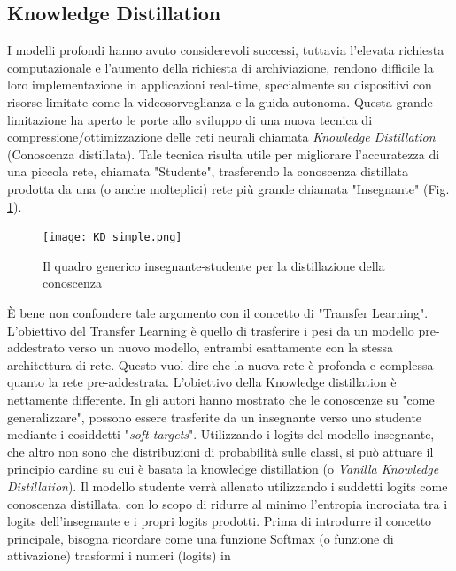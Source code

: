 \subsection{Knowledge Distillation}\label{KD_distill}
I modelli profondi hanno avuto considerevoli successi, tuttavia l'elevata richiesta 
computazionale e l'aumento della richiesta di archiviazione, rendono 
difficile la loro implementazione in applicazioni real-time, specialmente su 
dispositivi con risorse limitate come la videosorveglianza e la guida autonoma. 
Questa grande limitazione ha aperto le porte allo sviluppo di una 
nuova tecnica di compressione/ottimizzazione delle reti neurali chiamata 
\emph{Knowledge Distillation} (Conoscenza distillata). Tale tecnica risulta utile 
per migliorare l'accuratezza di una piccola rete, chiamata "Studente", trasferendo 
la conoscenza distillata prodotta da una (o anche molteplici) rete 
più grande chiamata "Insegnante" (Fig. \ref{KD_simple}).
\begin{figure}
    \centering
    \texttt{[image: KD simple.png]}
    \centering
    \caption{Il quadro generico insegnante-studente per la distillazione della conoscenza}
    \label{KD_simple}
\end{figure}
È bene non confondere tale 
argomento con il concetto di "Transfer Learning". L'obiettivo del Transfer 
Learning è quello di trasferire i pesi da un modello pre-addestrato verso 
un nuovo modello, entrambi esattamente con la stessa architettura di rete. 
Questo vuol dire che la nuova rete è profonda e complessa quanto la rete pre-addestrata.
L'obiettivo della Knowledge distillation è nettamente differente.
In \cite{hinton2015distilling} gli autori hanno mostrato che le conoscenze su "come generalizzare", 
possono essere trasferite da un insegnante verso uno studente mediante i 
cosiddetti "\emph{soft targets}". Utilizzando i logits del modello insegnante, che 
altro non sono che distribuzioni di probabilità sulle classi, si può attuare 
il principio cardine su cui è basata la knowledge distillation (o \emph{Vanilla 
Knowledge Distillation}). Il modello studente verrà allenato utilizzando i 
suddetti logits come conoscenza distillata, con lo scopo di ridurre al minimo 
l'entropia incrociata tra i logits dell'insegnante e i propri logits prodotti. 
Prima di introdurre il concetto principale, bisogna ricordare come una 
funzione Softmax (o funzione di attivazione) trasformi i numeri (logits) in 
